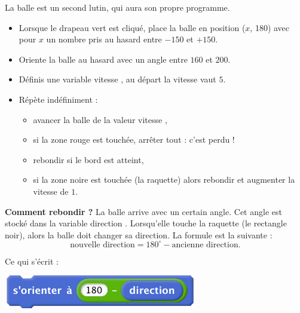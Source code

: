 \documentclass[class=report,crop=false, 12pt]{standalone}
\begin{document}
\begin{activite}
La balle est un second lutin, qui aura son propre programme.

\begin{itemize}
  \item Lorsque le drapeau vert est cliqué, place la balle en position ($x$, 180) avec pour $x$ un nombre pris au hasard entre $-150$ et $+150$.
  \item Oriente la balle au hasard avec un angle entre $160$ et $200$.
  \item Définis une variable \og vitesse \fg{}, au départ la vitesse vaut $5$. 
  \item Répète indéfiniment :
  \begin{itemize}
    \item avancer la balle de la valeur \og vitesse \fg{},
    \item si la zone rouge est touchée, arrêter tout : c'est perdu !
    \item rebondir si le bord est atteint,  
    \item si la zone noire est touchée (la raquette) alors rebondir et augmenter la vitesse de $1$.      
  \end{itemize}
\end{itemize}

\bigskip
\textbf{Comment rebondir ?}
La balle arrive avec un certain angle. Cet angle est stocké dans la variable \og direction \fg{}.
Lorsqu'elle touche la raquette (le rectangle noir), alors la balle doit changer sa direction.
La formule est la suivante :
$$\text{nouvelle direction} = 180^\circ - \text{ancienne direction}.$$


Ce qui s'écrit :
\begin{center}
  \includegraphics[scale=\scalebloc]{bloc-06-ex3}
\end{center}

\end{activite}
\end{document}
